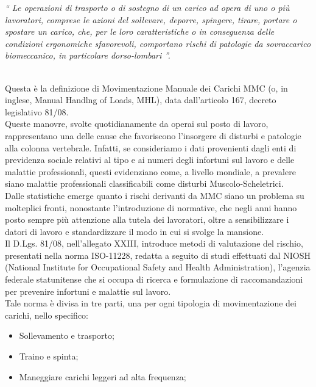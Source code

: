 \documentclass[a4paper]{article}
\begin{document}
\begin{addmargin}[1.5cm]{0cm}
\end{addmargin}
\begin{addmargin}{1.5cm}
\textit{“ Le operazioni di trasporto o di sostegno di un carico ad opera di uno o più
lavoratori, comprese le azioni del sollevare, deporre, spingere, tirare, portare o
spostare un carico, che, per le loro caratteristiche o in conseguenza delle
condizioni ergonomiche sfavorevoli, comportano rischi di patologie da
sovraccarico biomeccanico, in particolare dorso-lombari ”.} \\ \\
\end{addmargin}
Questa è la definizione di Movimentazione Manuale dei Carichi MMC (o, in inglese, Manual Handlng of Loads, MHL), data dall'articolo 167, decreto legislativo 81/08. \\ Queste manovre, svolte quotidianamente da operai sul posto di lavoro, rappresentano una delle cause che favoriscono l’insorgere di disturbi e patologie alla colonna vertebrale. Infatti, se consideriamo i dati provenienti dagli enti di previdenza sociale relativi al tipo e ai numeri degli infortuni sul lavoro e delle malattie professionali, questi evidenziano come, a livello mondiale, a prevalere siano malattie professionali classificabili come disturbi Muscolo-Scheletrici. \\
Dalle statistiche emerge quanto i rischi derivanti da MMC siano un problema su molteplici fronti, nonostante l'introduzione di normative, che negli anni hanno posto sempre più attenzione alla tutela dei lavoratori, oltre a sensibilizzare i datori di lavoro e standardizzare il modo in cui si svolge la mansione. \\
Il D.Lgs. 81/08, nell’allegato XXIII, introduce metodi di valutazione del rischio, presentati nella norma ISO-11228, redatta a seguito di studi effettuati dal NIOSH (National Institute for Occupational Safety and Health Administration), l’agenzia federale statunitense che si occupa di ricerca e formulazione di raccomandazioni per prevenire infortuni e malattie sul lavoro. \\
Tale norma è divisa in tre parti, una per ogni tipologia di movimentazione dei carichi, nello specifico:
\begin{itemize}
\item Sollevamento e trasporto;
\item Traino e spinta;
\item Maneggiare carichi leggeri ad alta frequenza;
\end{itemize}
\end{document}
